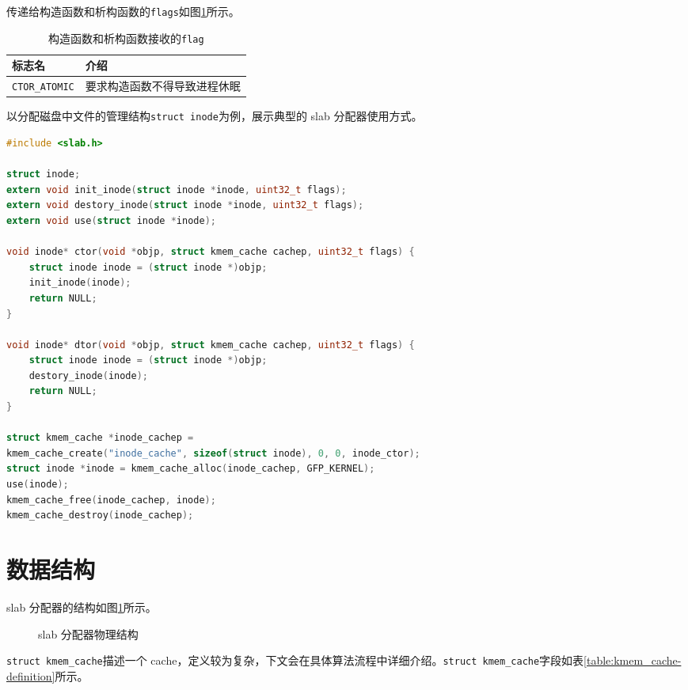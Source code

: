 \documentclass[AutoFakeBold]{LZUThesis}
\begin{document}
\begin{sloppypar}
传递给构造函数和析构函数的\texttt{flags}如图\ref{table:ctor-dtor-flags}所示。

\begin{longtable}[htb]{@{}ll@{}}
\caption{构造函数和析构函数接收的\texttt{flag}}\label{table:ctor-dtor-flags} \\
\toprule\noalign{}
标志名 & 介绍 \\
\midrule\noalign{}
\endhead
\bottomrule\noalign{}
\endlastfoot
\texttt{CTOR\_ATOMIC} & 要求构造函数不得导致进程休眠 \\
\end{longtable}

以分配磁盘中文件的管理结构\texttt{struct\ inode}为例，展示典型的 slab
分配器使用方式。

\begin{lstlisting}[language = c,numbers=none]
#include <slab.h>

struct inode;
extern void init_inode(struct inode *inode, uint32_t flags);
extern void destory_inode(struct inode *inode, uint32_t flags);
extern void use(struct inode *inode);

void inode* ctor(void *objp, struct kmem_cache cachep, uint32_t flags) {
    struct inode inode = (struct inode *)objp;
    init_inode(inode);
    return NULL;
}

void inode* dtor(void *objp, struct kmem_cache cachep, uint32_t flags) {
    struct inode inode = (struct inode *)objp;
    destory_inode(inode);
    return NULL;
}

struct kmem_cache *inode_cachep =
kmem_cache_create("inode_cache", sizeof(struct inode), 0, 0, inode_ctor);
struct inode *inode = kmem_cache_alloc(inode_cachep, GFP_KERNEL);
use(inode);
kmem_cache_free(inode_cachep, inode);
kmem_cache_destroy(inode_cachep);
\end{lstlisting}


\section{数据结构}

slab 分配器的结构如图\ref{figure:kmem_cache-physical-structure}所示。

\begin{figure}[H]
\centering

\caption{slab 分配器物理结构}
\label{figure:kmem_cache-physical-structure}
\end{figure}

\texttt{struct\ kmem\_cache}描述一个
cache，定义较为复杂，下文会在具体算法流程中详细介绍。\texttt{struct\ kmem\_cache}字段如表\ref{table:kmem_cache-definition}所示。


\end{sloppypar}
\end{document}
